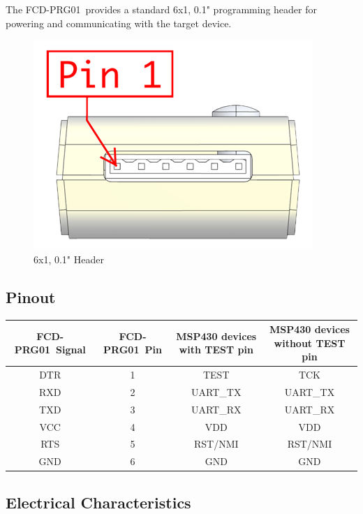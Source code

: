 \documentclass[10pt,letterpaper]{datasheet}
\newcommand{\PID}{FCD-PRG01}
\begin{document}
\begin{flushleft}
  The \PID\ provides a standard 6x1, 0.1" programming header for powering and communicating with the target device. \\

  \begin{figure}[!h]
    \label{fig:fcd-prg01-pinout}
    \begin{center}
      \includegraphics[width=2 in]{fcd-prg01-pinout}
    \end{center}
    \caption{6x1, 0.1" Header}
  \end{figure}
  
  \subsection*{Pinout}
  \begin{flushleft}
    \label{tab:pinout}
    \begin{tabular}{|c|c|c|c|}
      \hline
      \PID\ Signal &
      \PID\  Pin &
      MSP430 devices with TEST pin &
      MSP430 devices without TEST pin \\
      \hline
      DTR & 1 & TEST & TCK \\
      RXD & 2 & UART\_TX & UART\_TX \\
      TXD & 3 & UART\_RX & UART\_RX \\
      VCC & 4 & VDD & VDD \\
      RTS & 5 & RST/NMI & RST/NMI \\
      GND & 6 & GND & GND \\
      \hline
    \end{tabular}
  \end{flushleft}

  \bigskip

  \subsection*{Electrical Characteristics}

\end{flushleft}
\end{document}
